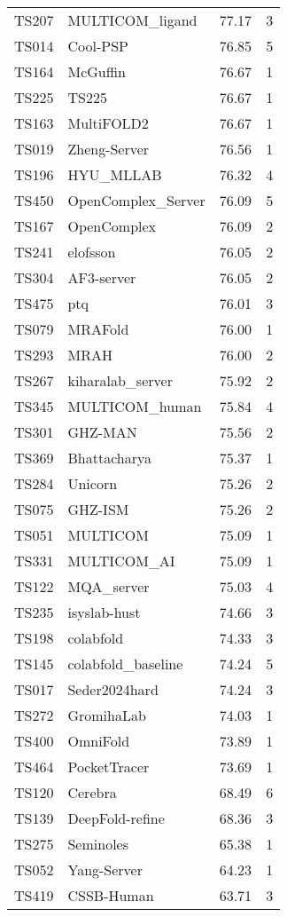 \begin{table}[ht]
{\begin{tabular}{llrr}
TS207 & MULTICOM\_ligand & 77.17 & 3 \\ 
TS014 & Cool-PSP & 76.85 & 5 \\ 
TS164 & McGuffin & 76.67 & 1 \\ 
TS225 & TS225 & 76.67 & 1 \\ 
TS163 & MultiFOLD2 & 76.67 & 1 \\ 
TS019 & Zheng-Server & 76.56 & 1 \\ 
TS196 & HYU\_MLLAB & 76.32 & 4 \\ 
TS450 & OpenComplex\_Server & 76.09 & 5 \\ 
TS167 & OpenComplex & 76.09 & 2 \\ 
TS241 & elofsson & 76.05 & 2 \\ 
TS304 & AF3-server & 76.05 & 2 \\ 
TS475 & ptq & 76.01 & 3 \\ 
TS079 & MRAFold & 76.00 & 1 \\ 
TS293 & MRAH & 76.00 & 2 \\ 
TS267 & kiharalab\_server & 75.92 & 2 \\ 
TS345 & MULTICOM\_human & 75.84 & 4 \\ 
TS301 & GHZ-MAN & 75.56 & 2 \\ 
TS369 & Bhattacharya & 75.37 & 1 \\ 
TS284 & Unicorn & 75.26 & 2 \\ 
TS075 & GHZ-ISM & 75.26 & 2 \\ 
TS051 & MULTICOM & 75.09 & 1 \\ 
TS331 & MULTICOM\_AI & 75.09 & 1 \\ 
TS122 & MQA\_server & 75.03 & 4 \\ 
TS235 & isyslab-hust & 74.66 & 3 \\ 
TS198 & colabfold & 74.33 & 3 \\ 
TS145 & colabfold\_baseline & 74.24 & 5 \\ 
TS017 & Seder2024hard & 74.24 & 3 \\ 
TS272 & GromihaLab & 74.03 & 1 \\ 
TS400 & OmniFold & 73.89 & 1 \\ 
TS464 & PocketTracer & 73.69 & 1 \\ 
TS120 & Cerebra & 68.49 & 6 \\ 
TS139 & DeepFold-refine & 68.36 & 3 \\ 
TS275 & Seminoles & 65.38 & 1 \\ 
TS052 & Yang-Server & 64.23 & 1 \\ 
TS419 & CSSB-Human & 63.71 & 3 \\ 

\end{tabular}}
\end{table}
